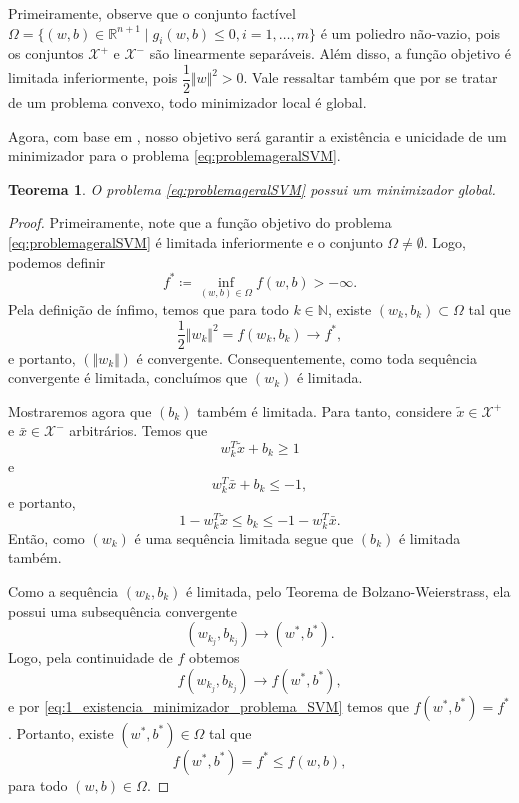 \documentclass[12pt,a4paper]{scrartcl}
\def\Xset{\mathcal{X}}
\def\RR{\mathds{R}}
\def\xbar{\bar{x}}
\newtheorem{teo}{Teorema}
\theoremstyle{definition}%
\begin{document}
Primeiramente, observe que o conjunto factível $\Omega = \{ (w,b) \in \RR^{n+1} \mid g_{i}(w,b) \leq 0, i = 1, \ldots , m \}$ é um poliedro não-vazio, pois os conjuntos $\Xset^{+}$ e $\Xset^{-}$ são linearmente separáveis. Além disso, a função objetivo é limitada inferiormente, pois $\dfrac{1}{2}\Vert w \Vert^{2} >0$. Vale ressaltar também que por se tratar de um problema convexo, todo minimizador local é global.

Agora, com base em \textcite{Evelin2017}, nosso objetivo será garantir a existência e unicidade de um minimizador para o problema \eqref{eq:problemageralSVM}.

\begin{teo} \label{teo:existencia_minimizador_problema_SVM}
O problema \eqref{eq:problemageralSVM} possui um minimizador global.
\end{teo}
\begin{proof}
Primeiramente, note que a função objetivo do problema \eqref{eq:problemageralSVM} é limitada inferiormente e o conjunto $\Omega \neq \emptyset$. Logo, podemos definir
\[
f^{*} \coloneqq \inf_{(w,b) \in \Omega} f(w,b) > -\infty .
\]
Pela definição de ínfimo, temos que para todo $k \in \mathds{N}$, existe $(w_{k},b_{k}) \subset \Omega$ tal que
\[ \label{eq:1_existencia_minimizador_problema_SVM}
\dfrac{1}{2}\Vert w_{k} \Vert^{2} = f(w_{k}, b_{k}) \rightarrow f^{*} ,
\]
e portanto, $(\Vert w_{k} \Vert )$ é convergente. Consequentemente, como toda sequência convergente é limitada, concluímos que $(w_{k})$ é limitada.

Mostraremos agora que $(b_{k})$ também é limitada. Para tanto, considere $\tilde{x} \in \Xset^{+}$ e $\xbar \in \Xset^{-}$ arbitrários. Temos que 
\[
w_{k}^{T}\tilde{x} + b_{k} \geq 1
\]
e
\[
w_{k}^{T}\xbar + b_{k} \leq -1,
\]
e portanto,
\[
1-w_{k}^{T}\tilde{x} \leq b_{k} \leq -1-w_{k}^{T}\xbar .
\]
Então, como $(w_{k})$ é uma sequência limitada segue que $(b_{k})$ é limitada também. 

Como a sequência $(w_{k}, b_{k})$ é limitada, pelo Teorema de Bolzano-Weierstrass, ela possui uma subsequência convergente 
\[
(w_{k_{j}}, b_{k_{j}}) \rightarrow (w^{*}, b^{*}).
\]
Logo, pela continuidade de $f$ obtemos
\[
f(w_{k_{j}}, b_{k_{j}}) \rightarrow f(w^{*}, b^{*}),
\]
e por \eqref{eq:1_existencia_minimizador_problema_SVM} temos que $f(w^{*}, b^{*}) = f^{*}$. Portanto, existe $(w^{*}, b^{*}) \in \Omega$ tal que
\[
f(w^{*}, b^{*}) = f^{*} \leq f(w,b),
\]
para todo $(w,b) \in \Omega$.
\end{proof}
\end{document}
